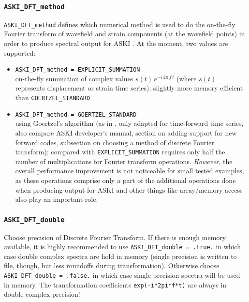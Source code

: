 \documentclass[12pt,a4paper]{article}
\newcommand{\lcode}[1]{\nolinkurl{#1}}
\newcommand{\ASKI}{ {\ttfamily ASKI} }
\begin{document}
\subsubsection*{\lcode{ASKI_DFT_method}}
\lcode{ASKI_DFT_method} defines which numerical method is used to do the on-the-fly Fourier transform of wavefield
and strain components (at the wavefield points) in order to produce spectral output for \ASKI{}. At the moment, 
two values are supported:
\begin{itemize}
\item \lcode{ASKI_DFT_method = EXPLICIT_SUMMATION} \\
  on-the-fly summation of complex values $s(t)\,e^{-i\,2\pi\,f\,t}$ (where $s(t)$ represents displacement or strain time series);
  slightly more memory efficient than \lcode{GOERTZEL_STANDARD}
\item \lcode{ASKI_DFT_method = GOERTZEL_STANDARD} \\
  using Goertzel's algorithm (as in \cite{Goertzel58}, only adapted for time-forward time series, also compare
  \ASKI{} developer's manual, section on adding support for new forward codes, subsection on choosing a method
  of discrete Fourier transform); 
  compared with \lcode{EXPLICIT_SUMMATION} requires only half the number of multiplications for Fourier 
  transform operations. \emph{However}, the overall performance improvement is not noticeable for small tested examples, as these 
  operations comprise only a part of the additional operations done when producing output for \ASKI{} and other
  things like array/memory access also play an important role.
\end{itemize}
\subsubsection*{\lcode{ASKI_DFT_double}}
Choose precision of Discrete Fourier Transform. If there is enough memory available, it is highly recommended
to use \lcode{ASKI_DFT_double = .true.} in which case double complex spectra are hold in memory (single precision is 
written to file, though, but less roundoffs during transformation). Otherwise choose \lcode{ASKI_DFT_double = .false.}
in which case single precision spectra will be used in memory. The transformation coefficients \lcode{exp(-i*2pi*f*t)} 
are always in double complex precision!
\end{document}
